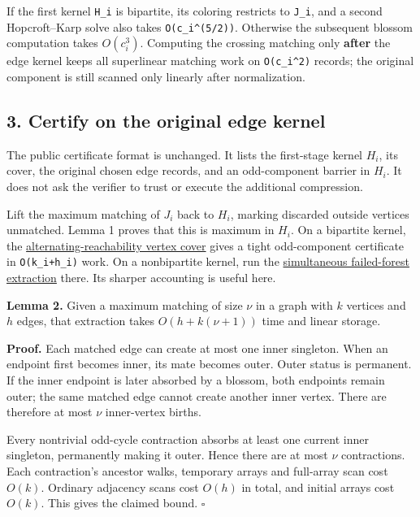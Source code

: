 If the first kernel \texttt{H\_i} is bipartite, its coloring restricts to \texttt{J\_i}, and a second Hopcroft--Karp solve also takes \texttt{O(c\_i\^{}(5/2))}. Otherwise the subsequent blossom computation takes \(O(c_i^3)\). Computing the crossing matching only \textbf{after} the edge kernel keeps all superlinear matching work on \texttt{O(c\_i\^{}2)} records; the original component is still scanned only linearly after normalization.

\hypertarget{af-e51d4b9b02-certify-on-the-original-edge-kernel}{%
\subsection{3. Certify on the original edge kernel}\label{af-e51d4b9b02-certify-on-the-original-edge-kernel}}

The public certificate format is unchanged. It lists the first-stage kernel \(H_i\), its cover, the original chosen edge records, and an odd-component barrier in \(H_i\). It does not ask the verifier to trust or execute the additional compression.

Lift the maximum matching of \(J_i\) back to \(H_i\), marking discarded outside vertices unmatched. Lemma 1 proves that this is maximum in \(H_i\). On a bipartite kernel, the \href{https://github.com/icekylinx/algorithm-frontier/blob/main/problems/general-matching/reference/bipartite-proof.md\#5-a-linear-certificate-on-the-first-kernel}{alternating-reachability vertex cover} gives a tight odd-component certificate in \texttt{O(k\_i+h\_i)} work. On a nonbipartite kernel, run the \href{https://github.com/icekylinx/algorithm-frontier/blob/main/problems/general-matching/reference/certificate-proof.md}{simultaneous failed-forest extraction} there. Its sharper accounting is useful here.

\textbf{Lemma 2.} Given a maximum matching of size \(\nu\) in a graph with \(k\) vertices and \(h\) edges, that extraction takes \(O(h+k(\nu+1))\) time and linear storage.

\textbf{Proof.} Each matched edge can create at most one inner singleton. When an endpoint first becomes inner, its mate becomes outer. Outer status is permanent. If the inner endpoint is later absorbed by a blossom, both endpoints remain outer; the same matched edge cannot create another inner vertex. There are therefore at most \(\nu\) inner-vertex births.

Every nontrivial odd-cycle contraction absorbs at least one current inner singleton, permanently making it outer. Hence there are at most \(\nu\) contractions. Each contraction's ancestor walks, temporary arrays and full-array scan cost \(O(k)\). Ordinary adjacency scans cost \(O(h)\) in total, and initial arrays cost \(O(k)\). This gives the claimed bound. \hfill\(\square\)

